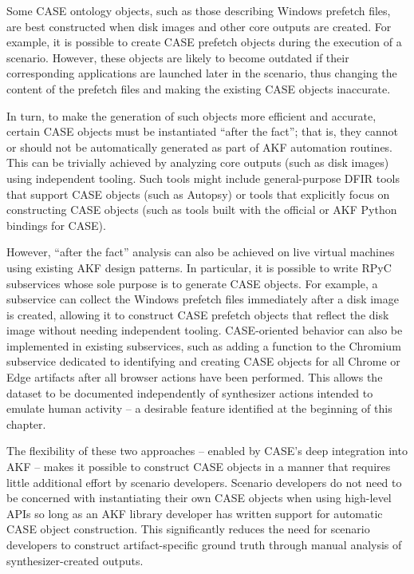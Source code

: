 \documentclass[letterpaper,12pt]{report}
\begin{document}
Some CASE ontology objects, such as those describing Windows prefetch
files, are best constructed when disk images and other core outputs are
created. For example, it is possible to create CASE prefetch objects
during the execution of a scenario. However, these objects are likely to
become outdated if their corresponding applications are launched later
in the scenario, thus changing the content of the prefetch files and
making the existing CASE objects inaccurate.

In turn, to make the generation of such objects more efficient and
accurate, certain CASE objects must be instantiated ``after the fact'';
that is, they cannot or should not be automatically generated as part of
AKF automation routines. This can be trivially achieved by analyzing
core outputs (such as disk images) using independent tooling. Such tools
might include general-purpose DFIR tools that support CASE objects (such
as Autopsy) or tools that explicitly focus on constructing CASE objects
(such as tools built with the official or AKF Python bindings for CASE).

However, ``after the fact'' analysis can also be achieved on live
virtual machines using existing AKF design patterns. In particular, it
is possible to write RPyC subservices whose sole purpose is to generate
CASE objects. For example, a subservice can collect the Windows prefetch
files immediately after a disk image is created, allowing it to
construct CASE prefetch objects that reflect the disk image without
needing independent tooling. CASE-oriented behavior can also be
implemented in existing subservices, such as adding a function to the
Chromium subservice dedicated to identifying and creating CASE objects
for all Chrome or Edge artifacts after all browser actions have been
performed. This allows the dataset to be documented independently of
synthesizer actions intended to emulate human activity -- a desirable
feature identified at the beginning of this chapter.

The flexibility of these two approaches -- enabled by CASE's deep
integration into AKF -- makes it possible to construct CASE objects in a
manner that requires little additional effort by scenario developers.
Scenario developers do not need to be concerned with instantiating their
own CASE objects when using high-level APIs so long as an AKF library
developer has written support for automatic CASE object construction.
This significantly reduces the need for scenario developers to construct
artifact-specific ground truth through manual analysis of
synthesizer-created outputs.
\end{document}
